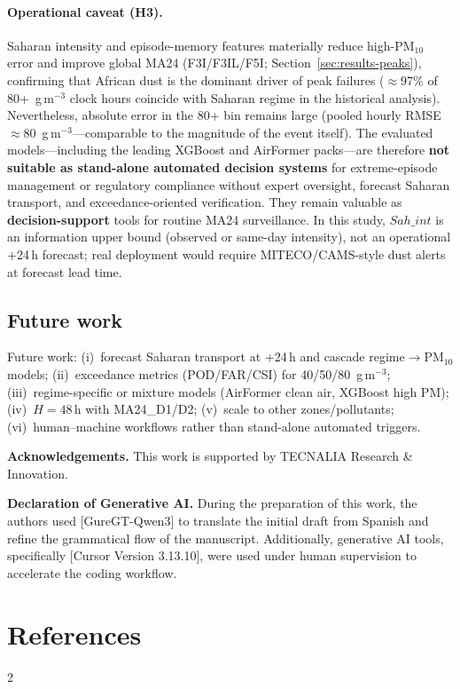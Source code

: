 \documentclass[11pt]{article}
\newcommand{\revnew}[1]{\textcolor{orange!75!black}{#1}}
\begin{document}
\revnew{\paragraph{Operational caveat (H3).} Saharan intensity and episode-memory features materially reduce high-PM$_{10}$ error and improve global MA24 (F3I/F3IL/F5I; Section~\ref{sec:results-peaks}), confirming that African dust is the dominant driver of peak failures ($\approx$97\% of 80+~\textmu g\,m$^{-3}$ clock hours coincide with Saharan regime in the historical analysis). Nevertheless, absolute error in the 80+ bin remains large (pooled hourly RMSE $\approx$80~\textmu g\,m$^{-3}$---comparable to the magnitude of the event itself). The evaluated models---including the leading XGBoost and AirFormer packs---are therefore \textbf{not suitable as stand-alone automated decision systems} for extreme-episode management or regulatory compliance without expert oversight, forecast Saharan transport, and exceedance-oriented verification. They remain valuable as \textbf{decision-support} tools for routine MA24 surveillance. In this study, $Sah\_int$ is an information upper bound (observed or same-day intensity), not an operational +24\,h forecast; real deployment would require MITECO/CAMS-style dust alerts at forecast lead time.}

\subsection{Future work}
\label{sec:future-work}

\revnew{Future work: (i)~forecast Saharan transport at +24\,h and cascade regime$\to$PM$_{10}$ models; (ii)~exceedance metrics (POD/FAR/CSI) for 40/50/80~\textmu g\,m$^{-3}$; (iii)~regime-specific or mixture models (AirFormer clean air, XGBoost high PM); (iv)~$H{=}48$\,h with MA24\_D1/D2; (v)~scale to other zones/pollutants; (vi)~human--machine workflows rather than stand-alone automated triggers.}

\vspace{1em}
\noindent\textbf{Acknowledgements.} This work is supported by TECNALIA Research \& Innovation.

\noindent\textbf{Declaration of Generative AI.} During the preparation of this work, the authors used [GureGT-Qwen3] to translate the initial draft from Spanish and refine the grammatical flow of the manuscript. Additionally, generative AI tools, specifically [Cursor Version 3.13.10], were used under human supervision to accelerate the coding workflow.

\revnew{%
\hypertarget{fig:heatmap}{}\label{fig:heatmap}%
\hypertarget{fig:pred-overview}{}\label{fig:pred-overview}%
\hypertarget{fig:realistic}{}\label{fig:realistic}%
\hypertarget{tab:peak-slices}{}\label{tab:peak-slices}%
}

\section*{References}
\label{sec:references}
\begin{multicols}{2}
\small

\end{multicols}
\end{document}
